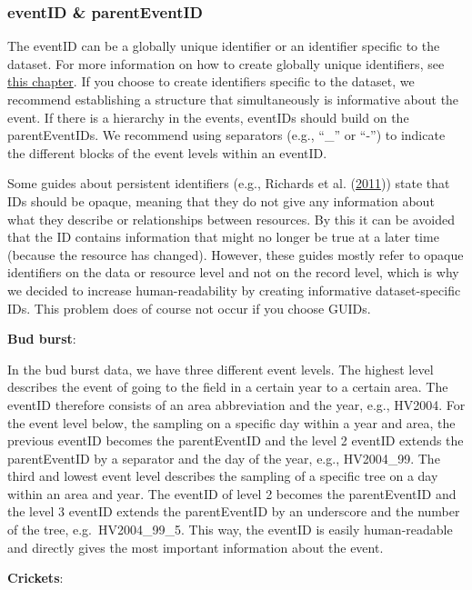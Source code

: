 \documentclass[
]{book}
\begin{document}
\hypertarget{eventID}{%
\subsubsection{eventID \& parentEventID}\label{eventID}}

The eventID can be a globally unique identifier or an identifier specific to the dataset. For more information on how to create globally unique identifiers, see \protect\hyperlink{GUIDcreation}{this chapter}. If you choose to create identifiers specific to the dataset, we recommend establishing a structure that simultaneously is informative about the event. If there is a hierarchy in the events, eventIDs should build on the parentEventIDs. We recommend using separators (e.g., ``\_'' or ``-'') to indicate the different blocks of the event levels within an eventID.

Some guides about persistent identifiers (e.g., Richards et al. (\protect\hyperlink{ref-Richards}{2011})) state that IDs should be opaque, meaning that they do not give any information about what they describe or relationships between resources. By this it can be avoided that the ID contains information that might no longer be true at a later time (because the resource has changed). However, these guides mostly refer to opaque identifiers on the data or resource level and not on the record level, which is why we decided to increase human-readability by creating informative dataset-specific IDs. This problem does of course not occur if you choose GUIDs.

\textbf{Bud burst}:

In the bud burst data, we have three different event levels. The highest level describes the event of going to the field in a certain year to a certain area. The eventID therefore consists of an area abbreviation and the year, e.g., HV2004. For the event level below, the sampling on a specific day within a year and area, the previous eventID becomes the parentEventID and the level 2 eventID extends the parentEventID by a separator and the day of the year, e.g., HV2004\_99. The third and lowest event level describes the sampling of a specific tree on a day within an area and year. The eventID of level 2 becomes the parentEventID and the level 3 eventID extends the parentEventID by an underscore and the number of the tree, e.g.~HV2004\_99\_5. This way, the eventID is easily human-readable and directly gives the most important information about the event.

\textbf{Crickets}:
\end{document}
